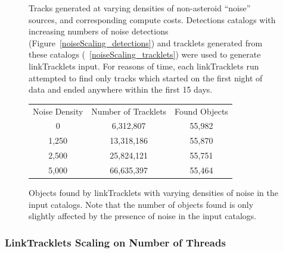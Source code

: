 \begin{figure}[ht!]

\caption{Tracks generated at varying densities of non-asteroid
  ``noise'' sources, and corresponding compute costs.  Detections
  catalogs with increasing numbers of noise detections
  (Figure~\ref{noiseScaling_detections}) and tracklets generated from
  these catalogs (~\ref{noiseScaling_tracklets}) were used to generate
  linkTracklets input. For reasons of time, each linkTracklets run
  attempted to find only tracks which started on the first night of
  data and ended anywhere within the first 15 days.}
\label{noiseScaling_tracks}
\end{figure}


\begin{figure}[ht!]
\centering
\begin{tabular}{|c c c|}
\hline

Noise Density & Number of Tracklets & Found Objects \\
0 & 6,312,807 & 55,982 \\
1,250 & 13,318,186 & 55,870  \\
2,500 & 25,824,121 &  55,751  \\
5,000 & 66,635,397 &  55,464  \\
\hline
\end{tabular}

\caption{Objects found by linkTracklets with varying densities of
  noise in the input catalogs.  Note that the number of objects found
  is only slightly affected by the presence of noise in the input
  catalogs.}
\label{noiseScaling_found}
\end{figure}



\subsubsection{LinkTracklets Scaling on Number of Threads}

